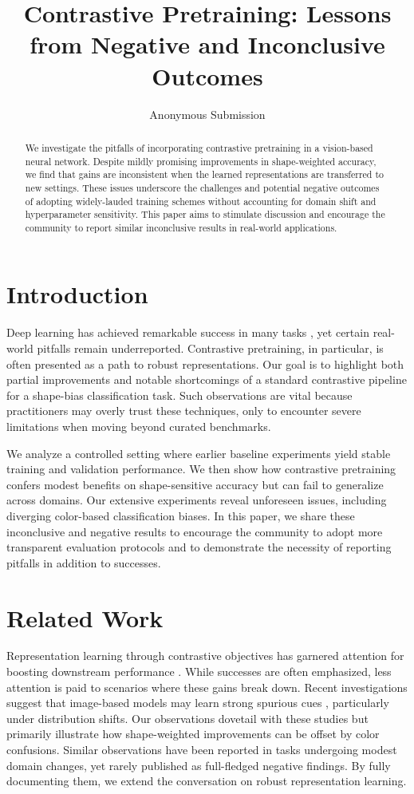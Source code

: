 \documentclass{article}
\title{Contrastive Pretraining: Lessons from Negative and Inconclusive Outcomes}
\author{%
Anonymous Submission
}
\begin{document}
\maketitle

\begin{abstract}
We investigate the pitfalls of incorporating contrastive pretraining in a vision-based neural network. Despite mildly promising improvements in shape-weighted accuracy, we find that gains are inconsistent when the learned representations are transferred to new settings. These issues underscore the challenges and potential negative outcomes of adopting widely-lauded training schemes without accounting for domain shift and hyperparameter sensitivity. This paper aims to stimulate discussion and encourage the community to report similar inconclusive results in real-world applications.
\end{abstract}

\section{Introduction}
Deep learning has achieved remarkable success in many tasks \citep{lecun2015deep}, yet certain real-world pitfalls remain underreported. Contrastive pretraining, in particular, is often presented as a path to robust representations. Our goal is to highlight both partial improvements and notable shortcomings of a standard contrastive pipeline for a shape-bias classification task. Such observations are vital because practitioners may overly trust these techniques, only to encounter severe limitations when moving beyond curated benchmarks.

We analyze a controlled setting where earlier baseline experiments yield stable training and validation performance. We then show how contrastive pretraining confers modest benefits on shape-sensitive accuracy but can fail to generalize across domains. Our extensive experiments reveal unforeseen issues, including diverging color-based classification biases. In this paper, we share these inconclusive and negative results to encourage the community to adopt more transparent evaluation protocols and to demonstrate the necessity of reporting pitfalls in addition to successes.

\section{Related Work}
Representation learning through contrastive objectives has garnered attention for boosting downstream performance \citep{chen2020simple}. While successes are often emphasized, less attention is paid to scenarios where these gains break down. Recent investigations suggest that image-based models may learn strong spurious cues \citep{geirhos2020shortcut}, particularly under distribution shifts. Our observations dovetail with these studies but primarily illustrate how shape-weighted improvements can be offset by color confusions. Similar observations have been reported in tasks undergoing modest domain changes, yet rarely published as full-fledged negative findings. By fully documenting them, we extend the conversation on robust representation learning.
\end{document}
